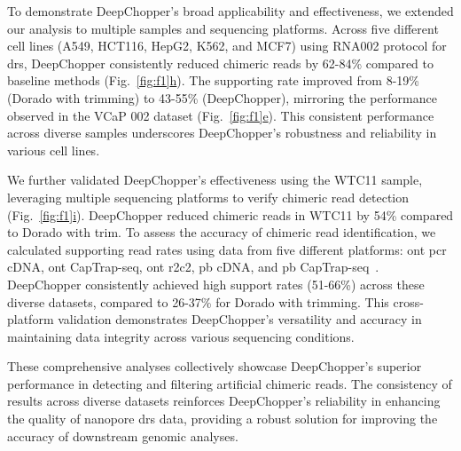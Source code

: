 \documentclass[pdflatex, sn-mathphys-num, lineno]{sn-jnl}%
\newcommand{\figref}[2]{Fig.~\hyperref[#1]{\ref*{#1}#2}}
\theoremstyle{thmstyleone}%
\theoremstyle{thmstyletwo}%
\theoremstyle{thmstylethree}%
\begin{document}
To demonstrate DeepChopper's broad applicability  and effectiveness, we extended our analysis to multiple samples and sequencing platforms.
Across five different cell lines (A549, HCT116, HepG2, K562, and MCF7) using RNA002 protocol for \gls{drs}, DeepChopper consistently reduced chimeric reads by 62-84\% compared to baseline methods (\figref{fig:f1}{h}).
The supporting rate improved from 8-19\% (Dorado with trimming) to 43-55\% (DeepChopper), mirroring the performance observed in the VCaP 002 dataset (\figref{fig:f1}{e}).
This consistent performance across diverse samples underscores DeepChopper's robustness and reliability in various cell lines.


We further validated DeepChopper's effectiveness using the WTC11 sample, leveraging multiple sequencing platforms to verify chimeric read detection (\figref{fig:f1}{i}).
DeepChopper reduced chimeric reads in WTC11 by 54\% compared to Dorado with trim.
To assess the accuracy of chimeric read identification, we calculated supporting read rates using data from five different platforms: \gls{ont} \gls{pcr} cDNA, \gls{ont} CapTrap-seq, \gls{ont} \gls{r2c2}, \gls{pb} cDNA, and \gls{pb} CapTrap-seq~\cite{carbonell2024captrap}.
DeepChopper consistently achieved high support rates (51-66\%) across these diverse datasets, compared to 26-37\% for Dorado with trimming.
This cross-platform validation demonstrates DeepChopper's versatility and accuracy in maintaining data integrity across various sequencing conditions.

These comprehensive analyses collectively showcase DeepChopper's superior performance in detecting and filtering artificial chimeric reads.
The consistency of results across diverse datasets reinforces DeepChopper's reliability in enhancing the quality of nanopore \gls{drs} data, providing a robust solution for improving the accuracy of downstream genomic analyses.
\end{document}
